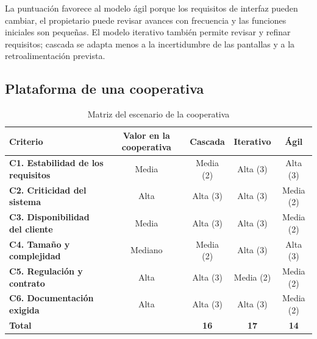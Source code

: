 La puntuación favorece al modelo ágil porque los requisitos de interfaz pueden
cambiar, el propietario puede revisar avances con frecuencia y las funciones
iniciales son pequeñas. El modelo iterativo también permite revisar y refinar
requisitos; cascada se adapta menos a la incertidumbre de las pantallas y a la
retroalimentación prevista.


\subsection{Plataforma de una cooperativa}

\begin{table}[H]
\centering\footnotesize
\caption{Matriz del escenario de la cooperativa}\label{tab:matriz-cooperativa}
\begin{tabularx}{\textwidth}{@{}Ycccc@{}}
\toprule
\textbf{Criterio} & \textbf{Valor en la cooperativa} & \textbf{Cascada} & \textbf{Iterativo} & \textbf{Ágil}\\
\midrule
\textbf{C1. Estabilidad de los requisitos} & Media & Media (2) & Alta (3) & Alta (3)\\
\textbf{C2. Criticidad del sistema} & Alta & Alta (3) & Alta (3) & Media (2)\\
\textbf{C3. Disponibilidad del cliente} & Media & Alta (3) & Alta (3) & Media (2)\\
\textbf{C4. Tamaño y complejidad} & Mediano & Media (2) & Alta (3) & Alta (3)\\
\textbf{C5. Regulación y contrato} & Alta & Alta (3) & Media (2) & Media (2)\\
\textbf{C6. Documentación exigida} & Alta & Alta (3) & Alta (3) & Media (2)\\
\midrule
\textbf{Total} & & \textbf{16} & \textbf{17} & \textbf{14}\\
\bottomrule
\end{tabularx}
\end{table}


